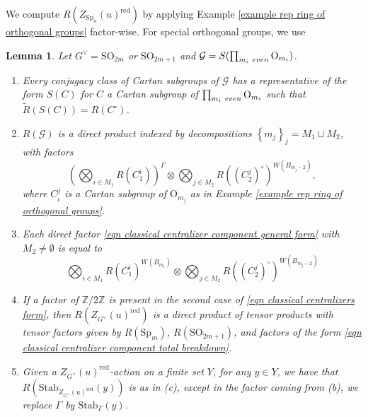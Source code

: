 \documentclass[10pt]{article}
\newcommand{\sett}[1]{\left\{#1\right\}}
\newcommand{\stab}[2]{\mathrm{Stab}_{#1}(#2)}
\newcommand{\Z}{\mathbb{Z}}
\newcommand{\SO}{\mathrm{SO}}
\newcommand{\Sp}{\mathrm{Sp}}
\newcommand{\OO}{\mathrm{O}}
\newtheorem{lem}{Lemma}
\theoremstyle{definition}
\theoremstyle{remark}
\newcommand{\Zur}{Z_{G^\vee}(u)^{\mathrm{red}}}
\newcommand{\Zz}{\mathcal{G}}
\begin{document}
We compute $R(Z_{\Sp_n}(u)^{\mathrm{red}})$ by applying Example \ref{example rep ring of orthogonal groups}
factor-wise. For special orthogonal groups, we use
%
\begin{lem}
\label{lem direct factors of special orthogonal centralizers from orthogonal}
Let $G^\vee=\SO_{2m}$ or $\SO_{2m+1}$ and 
$\Zz=S(\prod_{m_i~\emph{even}}\OO_{m_i})$.
\begin{enumerate}
%
\item[(a)]
Every conjugacy class of Cartan subgroups of $\Zz$ has a representative 
of the form $S(C)$ for $C$ a Cartan subgroup of $\prod_{m_i~\emph{even}}\OO_{m_i}$ such that
$\tilde{R}(S(C))=R(C^\circ)$.
%
\item[(b)] 
$R(\Zz)$ is a direct product indexed by decompositions $\sett{m_j}_j=M_1\sqcup M_2$, with factors
%
\begin{equation}
\label{eqn classical centralizer component general form}
\left(\bigotimes_{i\in M_1}R(C_1^i)\right)^{\Gamma}\otimes\bigotimes_{j\in M_2}R((C_2^{j})^\circ)^{W(B_{m_j-2})},
\end{equation}
%
where $C_i^j$ is a Cartan subgroup of $\OO_{m_j}$ as in Example \ref{example rep ring of orthogonal groups}.
%
\item[(c)]
Each direct factor \eqref{eqn classical centralizer component general form} with 
$M_2\neq \emptyset$ is equal to 
%
\begin{equation}
\label{eqn classical centralizer component total breakdown}
\bigotimes_{i\in M_1}R(C_1^i)^{W(B_{m_i})}\otimes\bigotimes_{j\in M_2}R((C_2^{j})^\circ)^{W(B_{m_j-2})}
\end{equation}
%
\item[(d)]
If a factor of $\Z/2\Z$ is present in the second case of \eqref{eqn classical centralizers form},
then $R(\Zur)$ is a direct product of tensor products with tensor factors given by $R(\Sp_m)$,
$R(\SO_{2m+1})$, and factors of the form \eqref{eqn classical centralizer component total breakdown}.
%
\item[(e)]
Given a $\Zur$-action on a finite set $Y$, for any $y\in Y$, we have that $R(\stab{\Zur}{y})$ is as in
(c), except in the factor coming from (b), we replace $\Gamma$ by $\stab{\Gamma}{y}$.
\end{enumerate}
\end{lem}
%
\end{document}
